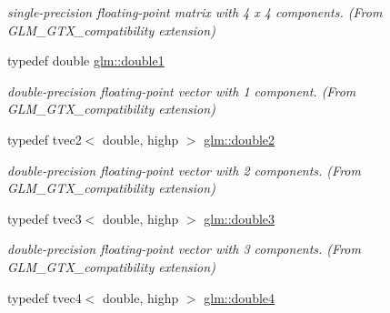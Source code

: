 \begin{DoxyCompactItemize}
\begin{DoxyCompactList}\small\item\em single-\/precision floating-\/point matrix with 4 x 4 components. (From G\-L\-M\-\_\-\-G\-T\-X\-\_\-compatibility extension) \end{DoxyCompactList}\item 
\hypertarget{group__gtx__compatibility_gab8b88350212cea916857cb2f49b8a29f}{typedef double \hyperlink{group__gtx__compatibility_gab8b88350212cea916857cb2f49b8a29f}{glm\-::double1}}\label{group__gtx__compatibility_gab8b88350212cea916857cb2f49b8a29f}

\begin{DoxyCompactList}\small\item\em double-\/precision floating-\/point vector with 1 component. (From G\-L\-M\-\_\-\-G\-T\-X\-\_\-compatibility extension) \end{DoxyCompactList}\item 
\hypertarget{group__gtx__compatibility_ga490652005dad57a41887b974195f36c1}{typedef tvec2$<$ double, highp $>$ \hyperlink{group__gtx__compatibility_ga490652005dad57a41887b974195f36c1}{glm\-::double2}}\label{group__gtx__compatibility_ga490652005dad57a41887b974195f36c1}

\begin{DoxyCompactList}\small\item\em double-\/precision floating-\/point vector with 2 components. (From G\-L\-M\-\_\-\-G\-T\-X\-\_\-compatibility extension) \end{DoxyCompactList}\item 
\hypertarget{group__gtx__compatibility_ga80c4961ce61e918f21c1546d43aea2f0}{typedef tvec3$<$ double, highp $>$ \hyperlink{group__gtx__compatibility_ga80c4961ce61e918f21c1546d43aea2f0}{glm\-::double3}}\label{group__gtx__compatibility_ga80c4961ce61e918f21c1546d43aea2f0}

\begin{DoxyCompactList}\small\item\em double-\/precision floating-\/point vector with 3 components. (From G\-L\-M\-\_\-\-G\-T\-X\-\_\-compatibility extension) \end{DoxyCompactList}\item 
\hypertarget{group__gtx__compatibility_ga43d433fc74b24a45801e2be74e7f6fca}{typedef tvec4$<$ double, highp $>$ \hyperlink{group__gtx__compatibility_ga43d433fc74b24a45801e2be74e7f6fca}{glm\-::double4}}\label{group__gtx__compatibility_ga43d433fc74b24a45801e2be74e7f6fca}


\end{DoxyCompactItemize}
